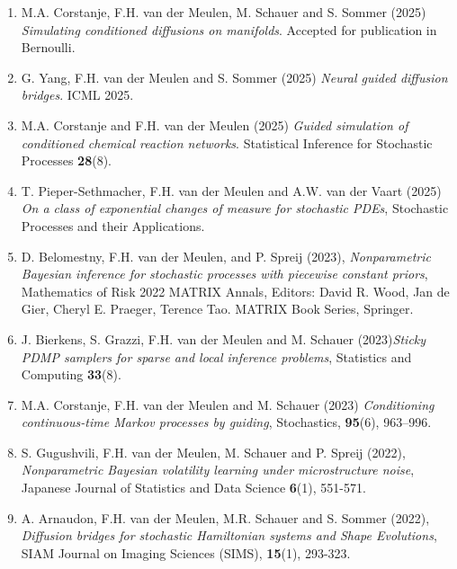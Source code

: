 \documentclass[
10pt, %
a4paper, %
oneside, %
headinclude,footinclude, %
BCOR5mm, %
]{scrartcl}
\begin{document}
\begin{enumerate}


\item {\sc M.A. Corstanje, F.H. van der Meulen, M. Schauer and S. Sommer} (2025) {\it Simulating conditioned diffusions on manifolds}. Accepted for publication in Bernoulli.

\item {\sc G. Yang, F.H. van der Meulen and S. Sommer} (2025) {\it Neural guided diffusion bridges}. ICML 2025.

\item {\sc M.A. Corstanje and F.H. van der Meulen} (2025) {\it Guided simulation of conditioned chemical reaction networks}. Statistical Inference for Stochastic Processes {\bf 28}(8). 

\item {\sc T. Pieper-Sethmacher, F.H. van der Meulen and A.W. van der Vaart} (2025) {\it On a class of exponential changes of measure for stochastic PDEs},  Stochastic Processes and their Applications. 

\item {\sc D. Belomestny, F.H. van der Meulen, and P. Spreij} (2023), {\it Nonparametric Bayesian inference for stochastic processes with piecewise constant priors}, Mathematics of Risk 2022 MATRIX Annals, Editors: David R. Wood, Jan de Gier, Cheryl E. Praeger, Terence Tao. MATRIX Book Series, Springer.

\item {\sc J. Bierkens, S. Grazzi, F.H. van der Meulen and M. Schauer} (2023){\it  Sticky PDMP samplers for sparse and local inference problems},  Statistics and Computing {\bf 33}(8). 

\item {\sc M.A. Corstanje, F.H. van der Meulen and M. Schauer} (2023) {\it  Conditioning continuous-time Markov processes by guiding}, Stochastics, {\bf 95}(6), 963--996.

\item {\sc S. Gugushvili, F.H. van der Meulen, M. Schauer and P. Spreij} (2022), {\it  Nonparametric Bayesian volatility learning under microstructure noise}, Japanese Journal of Statistics and Data Science {\bf 6}(1), 551-571.

\item {\sc A. Arnaudon, F.H. van der Meulen, M.R. Schauer and S. Sommer} (2022), {\it Diffusion bridges for stochastic Hamiltonian systems and Shape Evolutions},  SIAM Journal on Imaging Sciences (SIMS), {\bf 15}(1), 293-323.


\end{enumerate}
\end{document}
